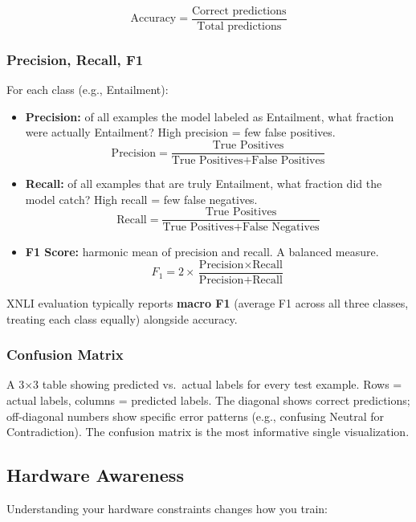 $$\text{Accuracy} = \frac{\text{Correct predictions}}{\text{Total predictions}}$$

\subsubsection{Precision, Recall, F1}

For each class (e.g., Entailment):

\begin{itemize}[nosep]
    \item \textbf{Precision:} of all examples the model labeled as Entailment, what fraction were actually Entailment? High precision = few false positives.
    $$\text{Precision} = \frac{\text{True Positives}}{\text{True Positives} + \text{False Positives}}$$
    \item \textbf{Recall:} of all examples that are truly Entailment, what fraction did the model catch? High recall = few false negatives.
    $$\text{Recall} = \frac{\text{True Positives}}{\text{True Positives} + \text{False Negatives}}$$
    \item \textbf{F1 Score:} harmonic mean of precision and recall. A balanced measure.
    $$F_1 = 2 \times \frac{\text{Precision} \times \text{Recall}}{\text{Precision} + \text{Recall}}$$
\end{itemize}

XNLI evaluation typically reports \textbf{macro F1} (average F1 across all three classes, treating each class equally) alongside accuracy.

\subsubsection{Confusion Matrix}

A 3$\times$3 table showing predicted vs.\ actual labels for every test example. Rows = actual labels, columns = predicted labels. The diagonal shows correct predictions; off-diagonal numbers show specific error patterns (e.g., confusing Neutral for Contradiction). The confusion matrix is the most informative single visualization.

\subsection{Hardware Awareness}

Understanding your hardware constraints changes how you train:

